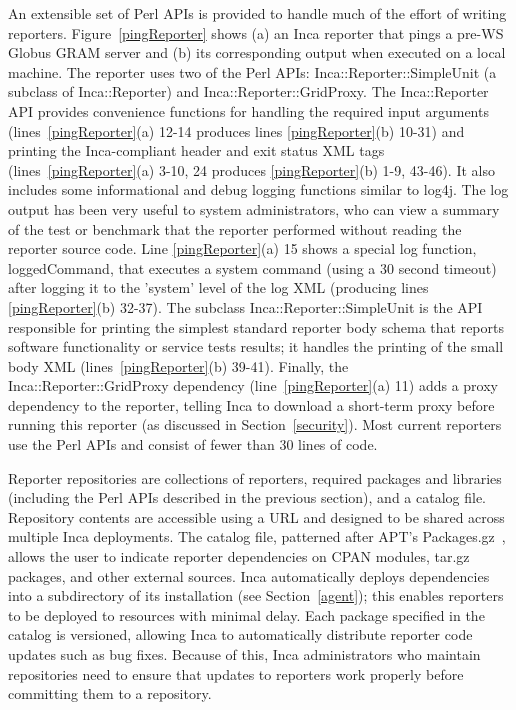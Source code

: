 \documentclass[times,10pt,twocolumn]{article}
\begin{document}
An extensible set of Perl APIs is provided to handle much of the effort of
writing reporters.  Figure~\ref{pingReporter} shows (a) an Inca reporter that
pings a pre-WS Globus GRAM server and (b) its corresponding output when
executed on a local machine.  The reporter uses two of the Perl APIs:
Inca::Reporter::SimpleUnit (a subclass of Inca::Reporter) and
Inca::Reporter::GridProxy.  The Inca::Reporter API provides convenience
functions for handling the required input arguments
(lines~\ref{pingReporter}(a) 12-14 produces lines \ref{pingReporter}(b)
10-31) and printing the Inca-compliant header and exit status XML tags
(lines~\ref{pingReporter}(a) 3-10, 24 produces \ref{pingReporter}(b)
1-9, 43-46).  It also includes some informational and debug logging functions
similar to log4j.  The log output has been very useful to system
administrators, who can view a summary of the test or benchmark that the
reporter performed without reading the reporter source code.  Line
\ref{pingReporter}(a) 15 shows a special log function, loggedCommand, that
executes a system command (using a 30 second timeout) after logging it to the
'system' level of the log XML (producing lines \ref{pingReporter}(b) 32-37).  The subclass
Inca::Reporter::SimpleUnit is the API responsible for printing the simplest
standard reporter body schema that reports software functionality or service
tests results; it handles the printing of the small body XML
(lines~\ref{pingReporter}(b) 39-41).  Finally, the
Inca::Reporter::GridProxy dependency (line~\ref{pingReporter}(a) 11) adds a proxy
dependency to the reporter, telling Inca to download a
short-term proxy before running this reporter (as discussed in
Section~\ref{security}).  Most current reporters use the Perl APIs and consist
of fewer than 30 lines of code.


Reporter repositories are collections of reporters, required
packages and libraries (including the Perl APIs described in the previous
section), and a catalog file.  Repository contents are accessible using a URL
and designed to be shared across multiple Inca deployments.  The catalog file,
patterned after APT's Packages.gz~\cite{apt}, allows the user to indicate
reporter dependencies on CPAN modules, tar.gz packages, and other external
sources.  Inca automatically deploys dependencies into a
subdirectory of its installation (see Section~\ref{agent}); this enables
reporters to be deployed to resources with minimal delay.  Each package
specified in the catalog is versioned, allowing Inca to
automatically distribute reporter code updates such as bug fixes.  Because of
this, Inca administrators who maintain repositories need to ensure
that updates to reporters work properly before committing them to a repository.
\end{document}
